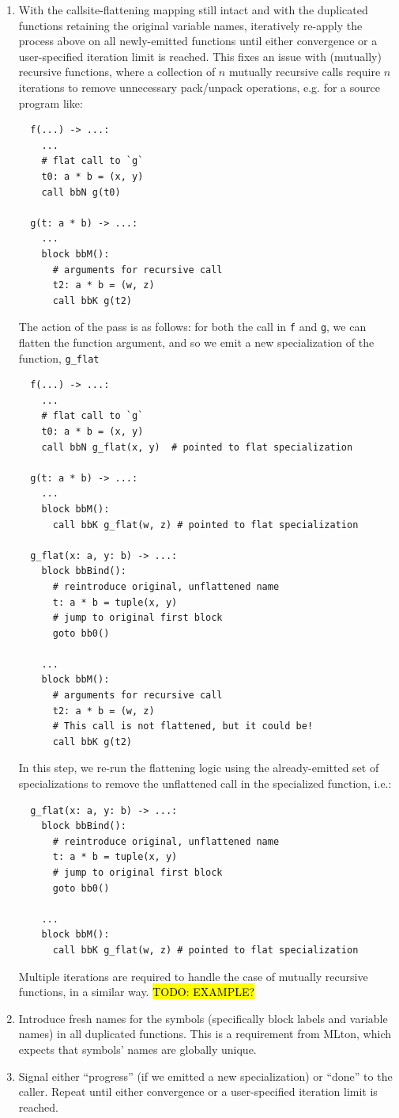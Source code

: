 \documentclass[leqno,11pt]{article}
\begin{document}
\begin{enumerate}
\item With the callsite-flattening mapping still intact and with the duplicated
  functions retaining the original variable names, iteratively re-apply the
  process above on all newly-emitted functions until either convergence or a
  user-specified iteration limit is reached. This fixes an issue with (mutually)
  recursive functions, where a collection of $n$ mutually recursive calls
  require $n$ iterations to remove unnecessary pack/unpack operations, e.g. for
  a source program like:
\begin{verbatim}
  f(...) -> ...:
    ...
    # flat call to `g`
    t0: a * b = (x, y)
    call bbN g(t0)

  g(t: a * b) -> ...:
    ...
    block bbM():
      # arguments for recursive call
      t2: a * b = (w, z)
      call bbK g(t2)
\end{verbatim}
The action of the pass is as follows: for both the call in \texttt{f} and
\texttt{g}, we can flatten the function argument, and so we emit a new
specialization of the function, \texttt{g\_flat}
\begin{verbatim}
  f(...) -> ...:
    ...
    # flat call to `g`
    t0: a * b = (x, y)
    call bbN g_flat(x, y)  # pointed to flat specialization

  g(t: a * b) -> ...:
    ...
    block bbM():
      call bbK g_flat(w, z) # pointed to flat specialization

  g_flat(x: a, y: b) -> ...:
    block bbBind():
      # reintroduce original, unflattened name
      t: a * b = tuple(x, y)
      # jump to original first block
      goto bb0()

    ...
    block bbM():
      # arguments for recursive call
      t2: a * b = (w, z)
      # This call is not flattened, but it could be!
      call bbK g(t2)
\end{verbatim}
In this step, we re-run the flattening logic using the already-emitted set of
specializations to remove the unflattened call in the specialized function, i.e.:
\begin{verbatim}
  g_flat(x: a, y: b) -> ...:
    block bbBind():
      # reintroduce original, unflattened name
      t: a * b = tuple(x, y)
      # jump to original first block
      goto bb0()

    ...
    block bbM():
      call bbK g_flat(w, z) # pointed to flat specialization
\end{verbatim}
Multiple iterations are required to handle the case of mutually recursive
functions, in a similar way. \hl{TODO: EXAMPLE?}

\item Introduce fresh names for the symbols (specifically block labels and
  variable names) in all duplicated functions. This is a requirement from MLton,
  which expects that symbols' names are globally unique.

\item Signal either ``progress'' (if we emitted a new specialization) or
  ``done'' to the caller. Repeat until either convergence or a user-specified
  iteration limit is reached.
\end{enumerate}
\end{document}
